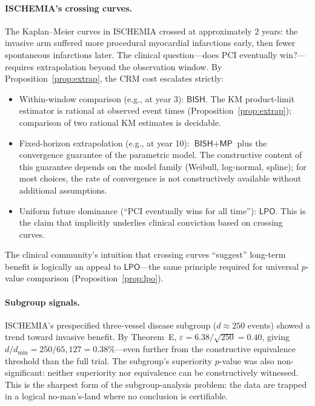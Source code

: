 \documentclass[11pt,a4paper]{article}
\theoremstyle{plain}
\theoremstyle{definition}
\newcommand{\BISH}{\textsf{BISH}}
\newcommand{\LPO}{\textsf{LPO}}
\newcommand{\MP}{\textsf{MP}}
\begin{document}
\paragraph{ISCHEMIA's crossing curves.}  The Kaplan--Meier curves in ISCHEMIA crossed at approximately 2 years: the invasive arm suffered more procedural myocardial infarctions early, then fewer spontaneous infarctions later.  The clinical question---does PCI eventually win?---requires extrapolation beyond the observation window.  By Proposition~\ref{prop:extrap}, the CRM cost escalates strictly:
\begin{itemize}[nosep]
\item Within-window comparison (e.g., at year 3): $\BISH$.  The KM product-limit estimator is rational at observed event times (Proposition~\ref{prop:extrap}); comparison of two rational KM estimates is decidable.
\item Fixed-horizon extrapolation (e.g., at year 10): $\BISH + \MP$ plus the convergence guarantee of the parametric model.  The constructive content of this guarantee depends on the model family (Weibull, log-normal, spline); for most choices, the rate of convergence is not constructively available without additional assumptions.
\item Uniform future dominance (``PCI eventually wins for all time''): $\LPO$.  This is the claim that implicitly underlies clinical conviction based on crossing curves.
\end{itemize}
The clinical community's intuition that crossing curves ``suggest'' long-term benefit is logically an appeal to $\LPO$---the same principle required for universal $p$-value comparison (Proposition~\ref{prop:lpo}).

\paragraph{Subgroup signals.}  ISCHEMIA's prespecified three-vessel disease subgroup ($d \approx 250$ events) showed a trend toward invasive benefit.  By Theorem~E, $\varepsilon = 6.38/\sqrt{250} = 0.40$, giving $d/d_{\min} = 250/65{,}127 = 0.38\%$---even further from the constructive equivalence threshold than the full trial.  The subgroup's superiority $p$-value was also non-significant: neither superiority nor equivalence can be constructively witnessed.  This is the sharpest form of the subgroup-analysis problem: the data are trapped in a logical no-man's-land where no conclusion is certifiable.
\end{document}
